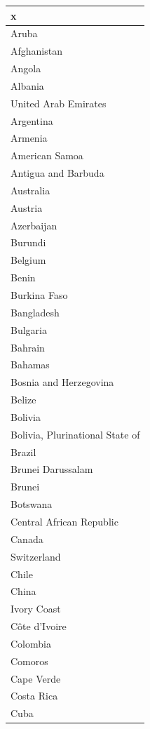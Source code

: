 \documentclass[]{article}
\begin{document}
\begin{table}

\centering
\begin{tabular}[t]{l}
\hline
x\\
\hline
Aruba\\
\hline
Afghanistan\\
\hline
Angola\\
\hline
Albania\\
\hline
United Arab Emirates\\
\hline
Argentina\\
\hline
Armenia\\
\hline
American Samoa\\
\hline
Antigua and Barbuda\\
\hline
Australia\\
\hline
Austria\\
\hline
Azerbaijan\\
\hline
Burundi\\
\hline
Belgium\\
\hline
Benin\\
\hline
Burkina Faso\\
\hline
Bangladesh\\
\hline
Bulgaria\\
\hline
Bahrain\\
\hline
Bahamas\\
\hline
Bosnia and Herzegovina\\
\hline
Belize\\
\hline
Bolivia\\
\hline
Bolivia, Plurinational State of\\
\hline
Brazil\\
\hline
Brunei Darussalam\\
\hline
Brunei\\
\hline
Botswana\\
\hline
Central African Republic\\
\hline
Canada\\
\hline
Switzerland\\
\hline
Chile\\
\hline
China\\
\hline
Ivory Coast\\
\hline
Côte d'Ivoire\\
\hline
Colombia\\
\hline
Comoros\\
\hline
Cape Verde\\
\hline
Costa Rica\\
\hline
Cuba\\

\end{tabular}
\end{table}
\end{document}

